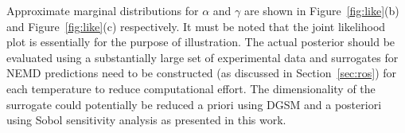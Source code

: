 Approximate marginal distributions for
$\alpha$ and $\gamma$ are shown in Figure~\ref{fig:like}(b) and Figure~\ref{fig:like}(c) respectively. 
It must be noted that the joint likelihood plot is essentially for the purpose of illustration. The actual posterior
should be evaluated using a substantially large set of experimental data and surrogates for NEMD predictions
need to be constructed (as discussed in Section~\ref{sec:ros}) for each temperature to reduce computational effort. 
The dimensionality of the surrogate could potentially be reduced a priori using DGSM and a posteriori using
Sobol sensitivity analysis as presented in this work. 























